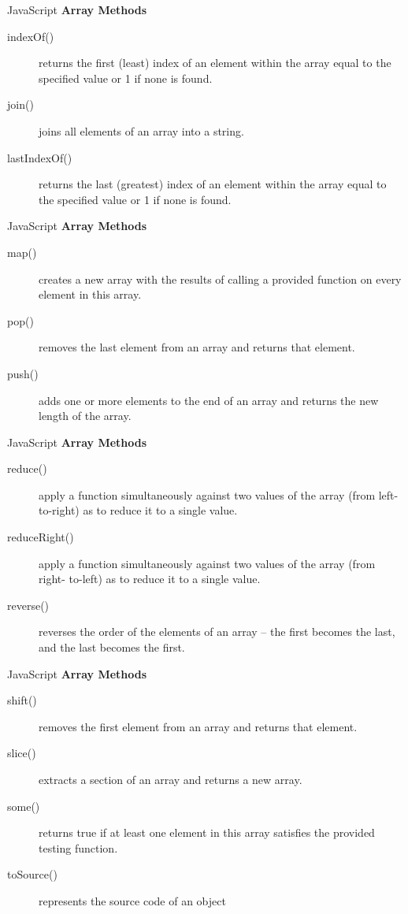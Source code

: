 \documentclass[14pt]{beamer}
\begin{document}
\begin{frame}{JavaScript}
\textbf{Array Methods}
\begin{description}
 \item [indexOf()] returns the first (least) index of an element within the array equal to the specified value or 1 if none is found.
 \item [join()] joins all elements of an array into a string.
 \item [lastIndexOf()] returns the last (greatest) index of an element within the array equal to the specified value or 1 if none is found.
\end{description}
\end{frame}

\begin{frame}{JavaScript}
\textbf{Array Methods}
\begin{description}
 \item [map()] creates a new array with the results of calling a provided function on every element in this array.
 \item [pop()] removes the last element from an array and returns that element.
 \item [push()] adds one or more elements to the end of an array and returns the new length of the array.
\end{description}
\end{frame}

\begin{frame}{JavaScript}
\textbf{Array Methods}
\begin{description}
 \item [reduce()] apply a function simultaneously against two values of the array (from left- to-right) as to reduce it to a single value.
 \item [reduceRight()] apply a function simultaneously against two values of the array (from right- to-left) as to reduce it to a single value.
 \item [reverse()] reverses the order of the elements of an array -- the first becomes the last, and the last becomes the first.
\end{description}
\end{frame}

\begin{frame}{JavaScript}
\textbf{Array Methods}
\begin{description}
 \item [shift()] removes the first element from an array and returns that element.
 \item [slice()] extracts a section of an array and returns a new array.
 \item [some()] returns true if at least one element in this array satisfies the provided testing function.
 \item [toSource()] represents the source code of an object
 \end{description}
\end{frame}
\end{document}
